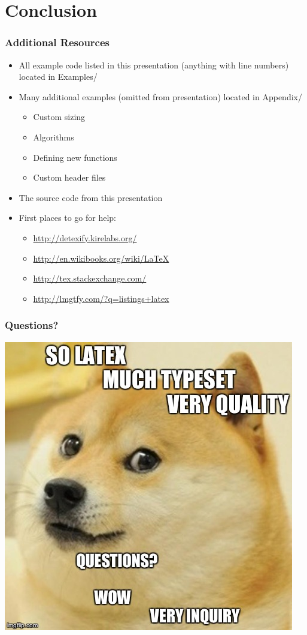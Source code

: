 \documentclass[notes=only]{beamer}
\begin{document}
\section{Conclusion}

\begin{frame}\frametitle{Additional Resources}
\begin{itemize}
\item All example code listed in this presentation (anything with line numbers) located in Examples/
\item Many additional examples (omitted from presentation) located in Appendix/
	\begin{itemize}
		\item Custom sizing
		\item Algorithms
		\item Defining new functions
		\item Custom header files
	\end{itemize}
\item The source code from this presentation	
\item First places to go for help:\\
\begin{itemize}
\item \url{http://detexify.kirelabs.org/}
\item \url{http://en.wikibooks.org/wiki/LaTeX}
\item \url{http://tex.stackexchange.com/}
\item \url{http://lmgtfy.com/?q=listings+latex}
\end{itemize}
\end{itemize}
\end{frame}

\begin{frame} \frametitle{Questions?}
\begin{center}
	\includegraphics[width=.7\textwidth]{Examples/doge.jpg}
	\end{center}
\end{frame}
\end{document}
